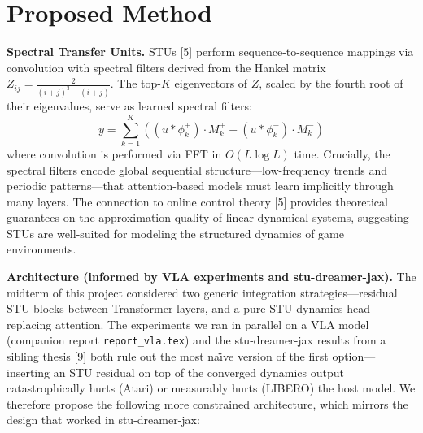\documentclass[10pt, letterpaper]{article}
\begin{document}
\section*{Proposed Method}

\textbf{Spectral Transfer Units.}
STUs [5] perform sequence-to-sequence mappings via convolution with spectral filters derived from the Hankel matrix $Z_{ij} = \frac{2}{(i+j)^3 - (i+j)}$. The top-$K$ eigenvectors of $Z$, scaled by the fourth root of their eigenvalues, serve as learned spectral filters:
\vspace{-0.3em}
\begin{equation}
y = \textstyle\sum_{k=1}^{K} \left( (u * \phi_k^+) \cdot M_k^+ + (u * \phi_k^-) \cdot M_k^- \right)
\end{equation}
\vspace{-0.3em}
where convolution is performed via FFT in $O(L \log L)$ time. Crucially, the spectral filters encode global sequential structure---low-frequency trends and periodic patterns---that attention-based models must learn implicitly through many layers. The connection to online control theory [5] provides theoretical guarantees on the approximation quality of linear dynamical systems, suggesting STUs are well-suited for modeling the structured dynamics of game environments.

\textbf{Architecture (informed by VLA experiments and stu-dreamer-jax).}
The midterm of this project considered two generic integration strategies---residual STU blocks between Transformer layers, and a pure STU dynamics head replacing attention. The experiments we ran in parallel on a VLA model (companion report \texttt{report\_vla.tex}) and the stu-dreamer-jax results from a sibling thesis [9] both rule out the most na{\"\i}ve version of the first option---inserting an STU residual on top of the converged dynamics output catastrophically hurts (Atari) or measurably hurts (LIBERO) the host model. We therefore propose the following more constrained architecture, which mirrors the design that worked in stu-dreamer-jax:
\end{document}
